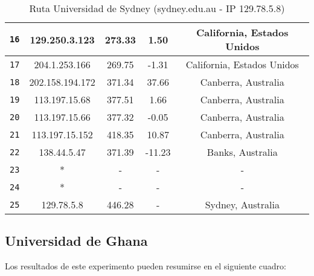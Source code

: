 \begin{table}[ht]
\begin{center}
\begin{tabular}{|c|c|c|c|c|}
    \texttt{16} & 129.250.3.123   & 273.33  & 1.50    & California, Estados Unidos    \\ \hline
    \texttt{17} & 204.1.253.166   & 269.75  & -1.31   & California, Estados Unidos   \\ \hline
    \texttt{18} & 202.158.194.172 & 371.34  & 37.66   & Canberra, Australia   \\ \hline
    \texttt{19} & 113.197.15.68   & 377.51  & 1.66    & Canberra, Australia   \\ \hline
    \texttt{20} & 113.197.15.66   & 377.32  & -0.05   & Canberra, Australia   \\ \hline
    \texttt{21} & 113.197.15.152  & 418.35  & 10.87   & Canberra, Australia    \\ \hline
    \texttt{22} & 138.44.5.47     & 371.39  & -11.23  & Banks, Australia   \\ \hline
    \texttt{23} & *               & -       & -       & -                \\ \hline
    \texttt{24} & *               & -       & -       & -   \\ \hline
    \texttt{25} & 129.78.5.8      & 446.28  & -       & Sydney, Australia   \\ \hline
    \end{tabular}
    \caption{Ruta Universidad de Sydney (sydney.edu.au - IP 129.78.5.8)}
\end{center}\end{table}


\subsection{Universidad de Ghana}

Los resultados de este experimento pueden resumirse en el siguiente cuadro:

